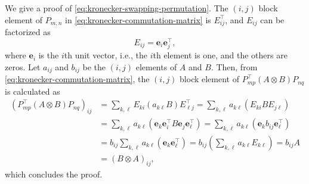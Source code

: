 \begin{Proof}
{We give a proof of \eqref{eq:kronecker-swapping-permutation}. The $(i,j)$ block element of $P_{m,n}$ in \eqref{eq:kronecker-commutation-matrix} is $E_{ij}^{\top}$, and $E_{ij}$ can be factorized as}
\[E_{ij}=\boldsymbol{e}_i\boldsymbol{e}_j^{\top},\]
{where $\boldsymbol{e}_i$ is the $i$th unit vector, i.e., the $i$th element is one, and the others are zeros. Let $a_{ij}$ and $b_{ij}$ be the $(i,j)$ elements of $A$ and $B$. Then, from \eqref{eq:kronecker-commutation-matrix}, the $(i,j)$ block element of $P_{mp}^{\top}(A\otimes B)P_{nq}$ is calculated as}
\[\begin{aligned}
\left(P_{mp}^{\top}(A\otimes B)P_{nq}\right)_{ij}
&=\sum_{k,\ell}E_{ki}(a_{k\ell}B)E_{\ell j}^{\top}=\sum_{k,\ell}a_{k\ell}\left(E_{ki}BE_{j\ell}\right)\\
&=\sum_{k,\ell}a_{k\ell}\left(\boldsymbol{e}_k\boldsymbol{e}_i^{\top}B\boldsymbol{e}_j\boldsymbol{e}_\ell^{\top}\right)
=\sum_{k,\ell}a_{k\ell}\left(\boldsymbol{e}_kb_{ij}\boldsymbol{e}_\ell^{\top}\right)\\
&=b_{ij}\sum_{k,\ell}a_{k\ell}\left(\boldsymbol{e}_k\boldsymbol{e}_\ell^{\top}\right)
=b_{ij}\left(\sum_{k,\ell}a_{k\ell}E_{k\ell}\right)=b_{ij}A\\
&=(B\otimes A)_{ij},
\end{aligned}\]
{which concludes the proof.}
\end{Proof}
